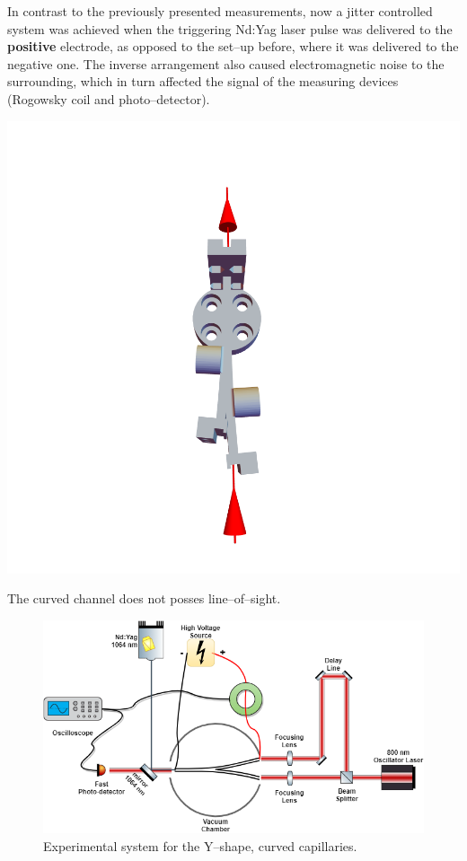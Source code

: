 \documentclass[../main.tex]{subfiles}
\begin{document}
In contrast to the previously presented measurements, now a jitter controlled system was achieved when the triggering Nd:Yag laser pulse was delivered to the \textbf{positive} electrode, as opposed to the set--up before, where it was delivered to the negative one. The inverse arrangement also caused electromagnetic noise to the surrounding, which in turn affected the signal of the measuring devices (Rogowsky coil and photo--detector).
\begin{marginfigure}
\includegraphics[width=\marginparwidth]{figures/Curved capillaries/line-of-sight.png}
\caption{The curved channel does not posses line--of--sight.}
\label{fig:lineofsight}
\end{marginfigure}

\begin{figure}
    \centering
    \includegraphics[width=\textwidth]{figures/Curved capillaries/system double capillary.png}
    \caption{Experimental system for the Y--shape, curved capillaries.}
    \label{fig:twostage_system}
\end{figure}
\end{document}
